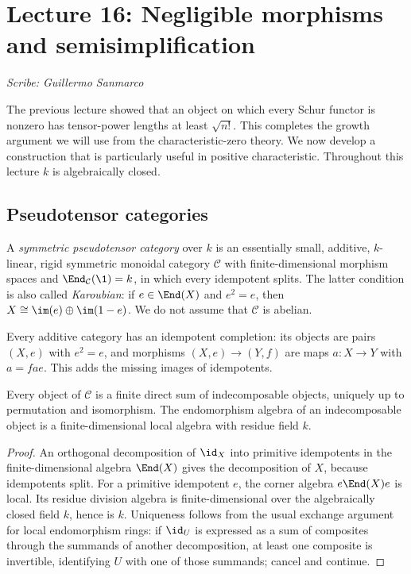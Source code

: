 \section{Lecture 16: Negligible morphisms and semisimplification}
\label{lec16}
\noindent\textit{Scribe: Guillermo Sanmarco}

The previous lecture showed that an object on which every Schur functor
is nonzero has tensor-power lengths at least $\sqrt{n!}$. This completes
the growth argument we will use from the characteristic-zero theory.
We now develop a construction that is particularly useful in positive
characteristic. Throughout this lecture $k$ is algebraically closed.

\subsection{Pseudotensor categories}

\begin{definition}
A \emph{symmetric pseudotensor category} over $k$ is an essentially
small, additive, $k$-linear, rigid symmetric monoidal category
$\mathcal C$ with finite-dimensional morphism spaces and
$\End_{\mathcal C}(\1)=k$, in which every idempotent splits.
The latter condition is also called \emph{Karoubian}: if
$e\in\End(X)$ and $e^2=e$, then $X\cong\im(e)\oplus\im(1-e)$.
We do not assume that $\mathcal C$ is abelian.
\end{definition}

Every additive category has an idempotent completion: its objects are
pairs $(X,e)$ with $e^2=e$, and morphisms $(X,e)\to(Y,f)$ are maps
$a:X\to Y$ with $a=fae$. This adds the missing images of idempotents.

\begin{proposition}
Every object of $\mathcal C$ is a finite direct sum of indecomposable
objects, uniquely up to permutation and isomorphism. The endomorphism
algebra of an indecomposable object is a finite-dimensional local
algebra with residue field $k$.
\end{proposition}
\begin{proof}
An orthogonal decomposition of $\id_X$ into primitive idempotents in
the finite-dimensional algebra $\End(X)$ gives the decomposition of
$X$, because idempotents split. For a primitive idempotent $e$, the
corner algebra $e\End(X)e$ is local. Its residue division algebra is
finite-dimensional over the algebraically closed field $k$, hence is
$k$. Uniqueness follows from the usual exchange argument for local
endomorphism rings: if $\id_U$ is expressed as a sum of composites
through the summands of another decomposition, at least one composite
is invertible, identifying $U$ with one of those summands; cancel and
continue.
\end{proof}

